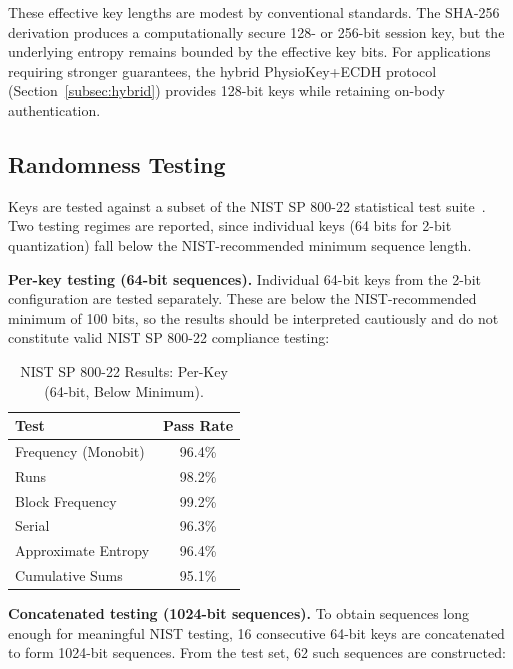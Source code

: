 \documentclass[sensors,article,submit,pdftex,moreauthors]{Definitions/mdpi}
\begin{document}
These effective key lengths are modest by conventional standards. The SHA-256 derivation produces a computationally secure 128- or 256-bit session key, but the underlying entropy remains bounded by the effective key bits. For applications requiring stronger guarantees, the hybrid PhysioKey+ECDH protocol (Section~\ref{subsec:hybrid}) provides 128-bit keys while retaining on-body authentication.

\subsection{Randomness Testing}
\label{subsec:nist}

Keys are tested against a subset of the NIST SP 800-22 statistical test suite~\cite{bassham2010nist}. Two testing regimes are reported, since individual keys (64 bits for 2-bit quantization) fall below the NIST-recommended minimum sequence length.

\textbf{Per-key testing (64-bit sequences).} Individual 64-bit keys from the 2-bit configuration are tested separately. These are below the NIST-recommended minimum of 100 bits, so the results should be interpreted cautiously and do not constitute valid NIST SP 800-22 compliance testing:

\begin{table}[H]
\caption{NIST SP 800-22 Results: Per-Key (64-bit, Below Minimum).\label{tab:nist_perkey}}
\begin{tabularx}{\textwidth}{lC}
\toprule
\textbf{Test} & \textbf{Pass Rate} \\
\midrule
Frequency (Monobit) & 96.4\% \\
Runs & 98.2\% \\
Block Frequency & 99.2\% \\
Serial & 96.3\% \\
Approximate Entropy & 96.4\% \\
Cumulative Sums & 95.1\% \\
\bottomrule
\end{tabularx}
\end{table}

\textbf{Concatenated testing (1024-bit sequences).} To obtain sequences long enough for meaningful NIST testing, 16 consecutive 64-bit keys are concatenated to form 1024-bit sequences. From the test set, 62 such sequences are constructed:
\end{document}
